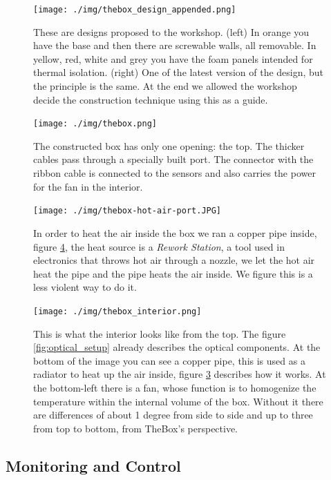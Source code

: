 \documentclass[master,       %
               twoside,        %
               BCOR10mm,       %
               ngerman,english  %
               ]{GAUBM_astro}
\begin{document}
\begin{figure}[h!]
\centering
\texttt{[image: ./img/thebox\_design\_appended.png]}
\caption{These are designs proposed to the workshop. (left) In orange you have the base and then there are screwable walls, all removable. In yellow, red, white and grey you have
the foam panels intended for thermal isolation. (right) One of the latest version of the design, but the principle is the same. At the end we allowed
the workshop decide the construction technique using this as a guide.}
\label{fig:thebox-design-appended} 
\end{figure}


\begin{figure}[h!]
\centering
\texttt{[image: ./img/thebox.png]}
\caption{The constructed box has only one opening: the top. The thicker cables pass through a specially built port. The connector with the ribbon
cable is connected to the sensors and also carries the power for the fan in the interior.}
\label{fig:thebox}
\end{figure}



\begin{figure}[h!]
\centering
\texttt{[image: ./img/thebox-hot-air-port.JPG]}
\caption{In order to heat the air inside the box we ran a copper pipe inside, figure \ref{fig:thebox-interior}, the heat source is a 
\emph{Rework Station}, a tool used in electronics that throws  hot air through a nozzle, we let the hot air heat the pipe and the pipe heats the air inside.
We figure this is a less violent way to do it.}
\label{fig:thebox-hot-air-port}
\end{figure}


\begin{figure}[h!]
\centering
\texttt{[image: ./img/thebox\_interior.png]}
\caption{This is what the interior looks like from the top. The figure \ref{fig:optical_setup} already describes the optical components. At the bottom of the image you can 
see a copper pipe, this is used as a radiator to heat up the air inside, figure \ref{fig:thebox-hot-air-port} describes how it works. At the bottom-left
there is a fan, whose function is to homogenize the temperature within the internal volume of the box. Without it there are differences of about 1
degree from side to side and up to three from top to bottom, from TheBox's perspective.}
\label{fig:thebox-interior}
\end{figure}



\subsection{Monitoring and Control}
\end{document}
